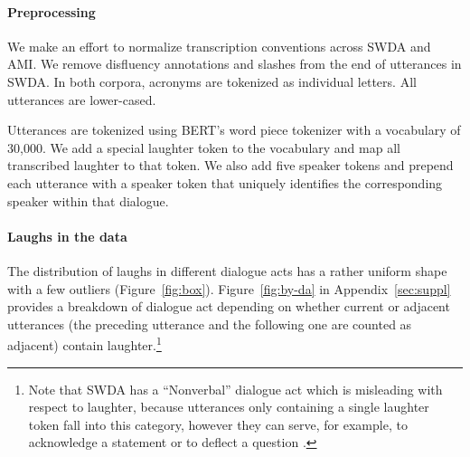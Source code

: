 \documentclass[11pt,a4paper]{article}
\begin{document}
\paragraph{Preprocessing}

We make an effort to normalize transcription conventions across SWDA and AMI.
We remove disfluency annotations and slashes from the end of utterances in SWDA.
In both corpora, acronyms are tokenized as individual letters. 
All utterances are lower-cased.

Utterances are tokenized using BERT's word piece tokenizer with a vocabulary of 30,000.
We add a special laughter token to the vocabulary and map all transcribed laughter to that token.
We also add five speaker tokens and prepend each utterance with a speaker token that uniquely identifies the corresponding speaker within that dialogue.

\paragraph{Laughs in the data}
The distribution of laughs in different dialogue acts has a rather uniform shape with a few outliers (Figure~\ref{fig:box}). 
Figure~\ref{fig:by-da} in Appendix~\ref{sec:suppl} provides a breakdown of dialogue act depending on whether current or adjacent utterances (the preceding utterance and the following one are counted as adjacent) contain laughter.\footnote{Note that SWDA has a ``Nonverbal'' dialogue act which is misleading with respect to laughter, because utterances only containing a single laughter token fall into this category, however they can serve, for example, to acknowledge a statement or to deflect a question  \citep{mazzocconi2019phd}.}
\end{document}
